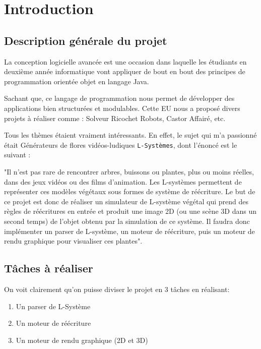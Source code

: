 

\begin{center}
    \Large{\tableofcontents}
\end{center}
\newpage

\section{Introduction}\label{intro}

    \subsection{Description générale du projet}
    \begin{onehalfspace}
        \Large{La conception logicielle avancée est une occasion dans 
        laquelle les étudiants en deuxième année informatique vont appliquer 
        de bout en bout des principes de programmation orientée objet en langage Java.} 
    
        \Large{Sachant que, ce langage de programmation nous permet de développer 
        des applications bien structurées et modulables. 
        Cette EU nous a proposé 
        divers projets à réaliser comme : Solveur Ricochet Robots, 
        Castor Affairé, etc. }
        
        \Large{Tous les thèmes étaient vraiment intéressants. En effet, le sujet qui 
        m'a passionné était Générateurs de flores vidéos-ludiques \texttt{L-Systèmes}, 
        dont l'énoncé est le suivant :}
        
        \Large{ "Il n'est pas rare de rencontrer arbres, buissons ou plantes, plus ou moins réelles, dans des jeux vidéos ou des films d'animation. Les L-systèmes permettent de représenter ces modèles
        végétaux sous formes de système de réécriture. Le but de ce projet est donc de réaliser un
        simulateur de L-système végétal qui prend des règles de réécritures en entrée et produit une image
        2D (ou une scène 3D dans un second temps) de l'objet obtenu par la simulation de ce système. Il
        faudra donc implémenter un parser de L-système, un moteur de réécriture, puis un moteur de
        rendu graphique pour visualiser ces plantes".}
        
        
     \newpage
        \subsection{Tâches à réaliser}
        \Large{On voit clairement qu'on puisse diviser le projet en 3 tâches en réalisant:}
        \begin{enumerate}
            \item Un parser de L-Système
            \item Un moteur de réécriture
            \item Un moteur de rendu graphique (2D et 3D)
        \end{enumerate}
    \end{onehalfspace}
